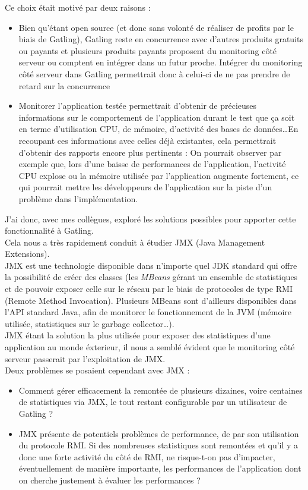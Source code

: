 Ce choix était motivé par deux raisons :
\begin{itemize}
	\item Bien qu'étant open source (et donc sans volonté de réaliser de profits par le biais de Gatling), Gatling reste en concurrence avec d'autres produits gratuits ou payants et plusieurs produits payants proposent du monitoring c\^oté serveur ou comptent en intégrer dans un futur proche. Intégrer du monitoring c\^oté serveur  dans Gatling permettrait donc à celui-ci de ne pas prendre de retard sur la concurrence
	\item Monitorer l'application testée permettrait d'obtenir de précieuses informations sur le comportement de l'application durant le test que ça soit en terme d'utilisation CPU, de mémoire, d'activité des bases de données\ldots En recoupant ces informations avec celles déjà existantes, cela permettrait d'obtenir des rapports encore plus pertinents : On pourrait observer par exemple que, lors d'une baisse de performances de l'application, l'activité CPU explose ou la mémoire utilisée par l'application augmente fortement, ce qui pourrait mettre les développeurs de l'application sur la piste d'un problème dans l'implémentation.\\
\end{itemize}

J'ai donc, avec mes collègues, exploré les solutions possibles pour apporter cette fonctionnalité à Gatling.\\

Cela nous a très rapidement conduit à étudier JMX (Java Management Extensions).\\
JMX est une technologie disponible dans n'importe quel JDK standard qui offre la possibilité de créer des classes (les \textit{MBeans} gérant un ensemble de statistiques et de pouvoir exposer celle sur le réseau par le biais de protocoles de type RMI (Remote Method Invocation). Plusieurs MBeans sont d'ailleurs disponibles dans l'API standard Java, afin de monitorer le fonctionnement de la JVM (mémoire utilisée, statistiques sur le garbage collector\ldots).\\
JMX étant la solution la plus utilisée pour exposer des statistiques d'une application au monde éxterieur, il nous a semblé évident que le monitoring c\^oté serveur passerait par l'exploitation de JMX.\\

Deux problèmes se posaient cependant avec JMX : 
\begin{itemize}
	\item Comment gérer efficacement la remontée  de plusieurs dizaines, voire centaines de statistiques via JMX, le tout restant configurable par un utilisateur de Gatling ?
	\item JMX présente de potentiels problèmes de performance, de par son utilisation du protocole RMI. Si des nombreuses statistiques sont remontées et qu'il y a donc une forte activité du c\^oté de RMI, ne risque-t-on pas d'impacter, éventuellement de manière importante, les performances de l'application dont on cherche justement à évaluer les performances ?
\end{itemize}

